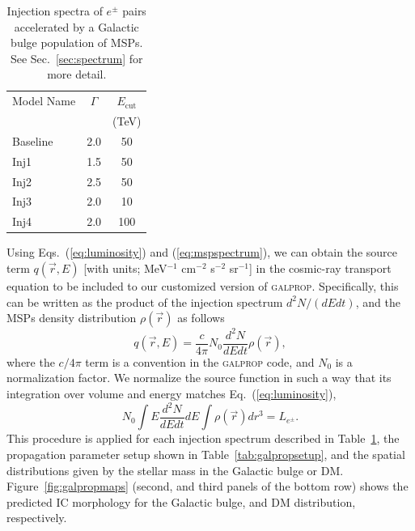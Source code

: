 \documentclass[doublespace,nopageskip]{VTthesis}
\begin{document}
\begin{table}[htb]
    \centering
    \caption{Injection spectra of $e^{\pm}$ pairs accelerated by a Galactic bulge population of MSPs. See Sec.~\ref{sec:spectrum} for more detail.}
    \begin{tabular}{lcc}
    \toprule
    Model Name&$\Gamma$ & $E_{\text{cut}}$\\
    & &  (TeV) \\
    \midrule
    Baseline &2.0 & 50 \\
    Inj1&1.5 & 50 \\
    Inj2&2.5 & 50 \\
    Inj3&2.0 & 10 \\
    Inj4&2.0 & 100\\
    \bottomrule
    \end{tabular}
    \label{tab:mspspectrum}
\end{table}

Using Eqs.~(\ref{eq:luminosity}) and (\ref{eq:mspspectrum}), we can obtain the source term $q(\vec{r},E)$ [with units; MeV$^{-1}$ cm$^{-2}$ s$^{-2}$ sr$^{-1}$] in the cosmic-ray transport equation to be included to our customized version of \textsc{galprop}. Specifically, this can be written as the product of the injection spectrum $d^2N/(dEdt)$, and the MSPs density distribution $\rho(\vec{r})$ as follows 
\begin{equation}\label{eq:sourcefunction}
  q(\vec{r},E) = \frac{c}{4\pi} N_0 \dfrac{d^2N}{dEdt}\rho(\vec{r}),
\end{equation}
where the $c/4\pi$ term is a convention in the \textsc{galprop} code, and $N_0$ is a normalization factor. We normalize the source function in such a way that its integration over volume and energy matches Eq.~(\ref{eq:luminosity}),
\begin{equation}
  \label{eq:norm}
  N_0 \int E\dfrac{d^2N}{dEdt}dE \int\rho(\vec{r})dr^3 = L_{e^\pm}. 
\end{equation}
This procedure is applied for each injection spectrum described in Table~\ref{tab:mspspectrum}, the propagation parameter setup shown in Table~\ref{tab:galpropsetup}, and the spatial distributions given by the stellar mass in the Galactic bulge or DM. Figure~\ref{fig:galpropmaps} (second, and third panels of the bottom row) shows the predicted IC morphology for the Galactic bulge, and DM distribution, respectively.
\end{document}
